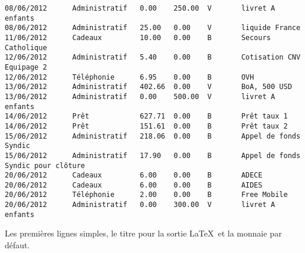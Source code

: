 \begin{verbatim}
08/06/2012      Administratif   0.00    250.00  V       livret A enfants
08/06/2012      Administratif   25.00   0.00    V       liquide France
11/06/2012      Cadeaux         10.00   0.00    B       Secours Catholique
12/06/2012      Administratif   5.40    0.00    B       Cotisation CNV Equipage 2
12/06/2012      Téléphonie      6.95    0.00    B       OVH
13/06/2012      Administratif   402.66  0.00    V       BoA, 500 USD
13/06/2012      Administratif   0.00    500.00  V       livret A enfants
14/06/2012      Prêt            627.71  0.00    B       Prêt taux 1
14/06/2012      Prêt            151.61  0.00    B       Prêt taux 2
15/06/2012      Administratif   218.06  0.00    B       Appel de fonds Syndic
15/06/2012      Administratif   17.90   0.00    B       Appel de fonds Syndic pour clôture
20/06/2012      Cadeaux         6.00    0.00    B       ADECE
20/06/2012      Cadeaux         6.00    0.00    B       AIDES
20/06/2012      Téléphonie      2.00    0.00    B       Free Mobile
20/06/2012      Administratif   0.00    300.00  V       livret A enfants
\end{verbatim}
\normalsize
Les premières lignes simples, le titre pour la sortie \LaTeX\
et la monnaie par défaut.
